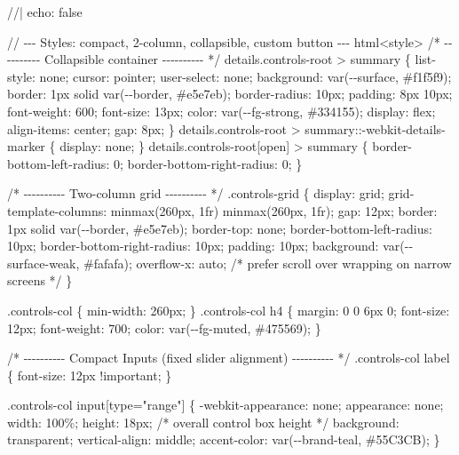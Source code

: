 \documentclass[
  letterpaper,
  DIV=11,
  numbers=noendperiod]{scrreprt}
\newenvironment{Shaded}{\begin{snugshade}}{\end{snugshade}}
\newcommand{\NormalTok}[1]{\textcolor[rgb]{0.00,0.23,0.31}{#1}}
\theoremstyle{definition}
\theoremstyle{plain}
\theoremstyle{definition}
\theoremstyle{remark}
\begin{document}
\begin{Shaded}
\begin{Highlighting}[]
\NormalTok{//| echo: false}

\NormalTok{// {-}{-}{-} Styles: compact, 2{-}column, collapsible, custom button {-}{-}{-}}
\NormalTok{html\textasciigrave{}\textless{}style\textgreater{}}
\NormalTok{/* {-}{-}{-}{-}{-}{-}{-}{-}{-}{-} Collapsible container {-}{-}{-}{-}{-}{-}{-}{-}{-}{-} */}
\NormalTok{details.controls{-}root \textgreater{} summary \{}
\NormalTok{  list{-}style: none; cursor: pointer; user{-}select: none;}
\NormalTok{  background: var({-}{-}surface, \#f1f5f9);}
\NormalTok{  border: 1px solid var({-}{-}border, \#e5e7eb);}
\NormalTok{  border{-}radius: 10px;}
\NormalTok{  padding: 8px 10px;}
\NormalTok{  font{-}weight: 600; font{-}size: 13px;}
\NormalTok{  color: var({-}{-}fg{-}strong, \#334155);}
\NormalTok{  display: flex; align{-}items: center; gap: 8px;}
\NormalTok{\}}
\NormalTok{details.controls{-}root \textgreater{} summary::{-}webkit{-}details{-}marker \{ display: none; \}}
\NormalTok{details.controls{-}root[open] \textgreater{} summary \{ border{-}bottom{-}left{-}radius: 0; border{-}bottom{-}right{-}radius: 0; \}}

\NormalTok{/* {-}{-}{-}{-}{-}{-}{-}{-}{-}{-} Two{-}column grid {-}{-}{-}{-}{-}{-}{-}{-}{-}{-} */}
\NormalTok{.controls{-}grid \{}
\NormalTok{  display: grid;}
\NormalTok{  grid{-}template{-}columns: minmax(260px, 1fr) minmax(260px, 1fr);}
\NormalTok{  gap: 12px;}
\NormalTok{  border: 1px solid var({-}{-}border, \#e5e7eb); border{-}top: none;}
\NormalTok{  border{-}bottom{-}left{-}radius: 10px; border{-}bottom{-}right{-}radius: 10px;}
\NormalTok{  padding: 10px;}
\NormalTok{  background: var({-}{-}surface{-}weak, \#fafafa);}
\NormalTok{  overflow{-}x: auto; /* prefer scroll over wrapping on narrow screens */}
\NormalTok{\}}

\NormalTok{.controls{-}col \{ min{-}width: 260px; \}}
\NormalTok{.controls{-}col h4 \{}
\NormalTok{  margin: 0 0 6px 0;}
\NormalTok{  font{-}size: 12px; font{-}weight: 700;}
\NormalTok{  color: var({-}{-}fg{-}muted, \#475569);}
\NormalTok{\}}

\NormalTok{/* {-}{-}{-}{-}{-}{-}{-}{-}{-}{-} Compact Inputs (fixed slider alignment) {-}{-}{-}{-}{-}{-}{-}{-}{-}{-} */}
\NormalTok{.controls{-}col label \{ font{-}size: 12px !important; \}}

\NormalTok{.controls{-}col input[type="range"] \{}
\NormalTok{  {-}webkit{-}appearance: none;}
\NormalTok{  appearance: none;}
\NormalTok{  width: 100\%;}
\NormalTok{  height: 18px;                     /* overall control box height */}
\NormalTok{  background: transparent;}
\NormalTok{  vertical{-}align: middle;}
\NormalTok{  accent{-}color: var({-}{-}brand{-}teal, \#55C3CB);}
\NormalTok{\}}


\end{Highlighting}
\end{Shaded}
\end{document}
